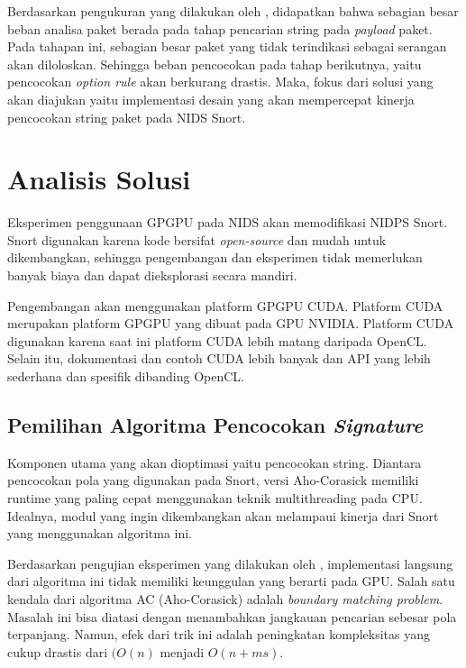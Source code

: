 
    Berdasarkan pengukuran yang dilakukan oleh \citep{kargus2012}, didapatkan bahwa sebagian besar beban analisa paket berada pada tahap pencarian string pada \emph{payload} paket. Pada tahapan ini, sebagian besar paket yang tidak terindikasi sebagai serangan akan diloloskan. Sehingga beban pencocokan pada tahap berikutnya, yaitu pencocokan \emph{option rule} akan berkurang drastis. Maka, fokus dari solusi yang akan diajukan yaitu implementasi desain yang akan mempercepat kinerja pencocokan string paket pada NIDS Snort.

  \section{Analisis Solusi}

    Eksperimen penggunaan GPGPU pada NIDS akan memodifikasi NIDPS Snort. Snort digunakan karena kode bersifat \emph{open-source} dan mudah untuk dikembangkan, sehingga pengembangan dan eksperimen tidak memerlukan banyak biaya dan dapat dieksplorasi secara mandiri. 

    Pengembangan akan menggunakan platform GPGPU CUDA. Platform CUDA merupakan platform GPGPU yang dibuat pada GPU NVIDIA. Platform CUDA digunakan karena saat ini platform CUDA lebih matang daripada OpenCL. Selain itu, dokumentasi dan contoh CUDA lebih banyak dan API yang lebih sederhana dan spesifik dibanding OpenCL.

    \subsection{Pemilihan Algoritma Pencocokan \emph{Signature}}

      Komponen utama yang akan dioptimasi yaitu pencocokan string. Diantara pencocokan pola yang digunakan pada Snort, versi Aho-Corasick memiliki runtime yang paling cepat menggunakan teknik multithreading pada CPU. Idealnya, modul yang ingin dikembangkan akan melampaui kinerja dari Snort yang menggunakan algoritma ini.
      
      Berdasarkan pengujian eksperimen yang dilakukan oleh \citep{lin2013}, implementasi langsung dari algoritma ini tidak memiliki keunggulan yang berarti pada GPU. Salah satu kendala dari algoritma AC (Aho-Corasick) adalah \emph{boundary matching problem}. Masalah ini bisa diatasi dengan menambahkan jangkauan pencarian sebesar pola terpanjang. Namun, efek dari trik ini adalah peningkatan kompleksitas yang cukup drastis dari $(O(n)$ menjadi $O(n + ms)$. 
      
